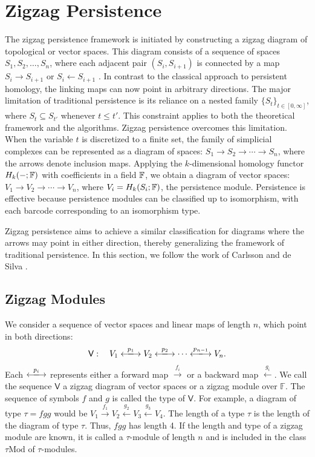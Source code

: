 \section{Zigzag Persistence}
\label{ZigzagPersistence}
The zigzag persistence framework is initiated by constructing a zigzag diagram of topological or vector spaces. This diagram consists of a sequence of spaces \( S_1, S_2, \ldots, S_n \), where each adjacent pair \( (S_i, S_{i+1}) \) is connected by a map \( S_i \to S_{i+1} \) or \( S_i \leftarrow S_{i+1} \) \cite[\S 1]{carlsson2010zigzag}. In contrast to the classical approach to persistent homology, the linking maps can now point in arbitrary directions. The major limitation of traditional persistence is its reliance on a nested family \(\{S_t\}_{t \in [0,\infty]}\), where \(S_t \subseteq S_{t'}\) whenever \(t \leq t'\). This constraint applies to both the theoretical framework and the algorithms. Zigzag persistence overcomes this limitation. When the variable \(t\) is discretized to a finite set, the family of simplicial complexes can be represented as a diagram of spaces: $S_1 \to S_2 \to \cdots \to S_n$, where the arrows denote inclusion maps. Applying the \(k\)-dimensional homology functor \(H_k(-; {\mathbb{F}})\) with coefficients in a field \({\mathbb{F}}\), we obtain a diagram of vector spaces: $V_1 \to V_2 \to \cdots \to V_n$, where \(V_i = H_k(S_i; {\mathbb{F}})\), the persistence module. Persistence is effective because persistence modules can be classified up to isomorphism, with each barcode corresponding to an isomorphism type.

Zigzag persistence aims to achieve a similar classification for diagrams where the arrows may point in either direction, thereby generalizing the framework of traditional persistence. In this section, we follow the work of Carlsson and de Silva \cite[\S 2.1]{carlsson2010zigzag}.

\subsection{Zigzag Modules}
\label{ZigtagModules}
We consider a sequence of vector spaces and linear maps of length \(n\), which point in both directions:
\begin{align}
    \mathsf{V}: \quad V_1 \xlongleftrightarrow{p_1} V_2 \xlongleftrightarrow{p_2} \cdots \xlongleftrightarrow{p_{n-1}} V_n.
\end{align}
Each \(\xlongleftrightarrow{p_i}\) represents either a forward map \(\xrightarrow{f_i}\) or a backward map \(\xleftarrow{g_i}\). We call the sequence \(\mathsf{V}\) a zigzag diagram of vector spaces or a zigzag module over \(\mathbb{F}\). The sequence of symbols \(f\) and \(g\) is called the type of \(\mathsf{V}\). For example, a diagram of type \(\tau = fgg\) would be \(V_1 \xrightarrow{f_1} V_2 \xleftarrow{g_2} V_3 \xleftarrow{g_3} V_4\). The length of a type \(\tau\) is the length of the diagram of type \(\tau\). Thus, \(fgg\) has length 4. If the length and type of a zigzag module are known, it is called a \(\tau\)-module of length \(n\) and is included in the class \(\tau\text{Mod}\) of \(\tau\)-modules.

